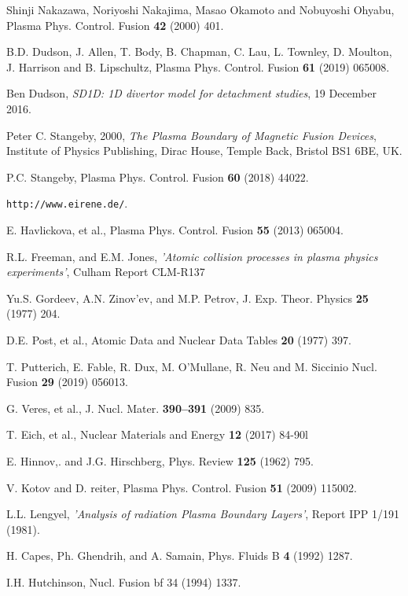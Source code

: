 \documentclass[amsmath,amssymb,a4]{revtex4-2}
\begin{document}
{\begin{thebibliography}{99}
Shinji Nakazawa, Noriyoshi Nakajima, Masao Okamoto and Nobuyoshi Ohyabu, Plasma Phys. Control. Fusion {\bf 42} (2000) 401.

B.D. Dudson, J. Allen, T. Body, B. Chapman, C. Lau, L. Townley, D. Moulton, J. Harrison and B. Lipschultz, Plasma Phys. Control. Fusion {\bf 61} (2019) 065008.

Ben Dudson, {\it SD1D: 1D divertor model for detachment studies}, 19 December 2016.

Peter C. Stangeby, 2000, {\it The Plasma Boundary of Magnetic Fusion Devices}, Institute of Physics Publishing, Dirac House, Temple Back, Bristol BS1 6BE,
UK.

P.C. Stangeby, Plasma Phys. Control. Fusion {\bf 60} (2018) 44022. 


{\tt http://www.eirene.de/}.

E. Havlickova, et al., Plasma Phys. Control. Fusion {\bf 55} (2013) 065004.

R.L. Freeman, and E.M. Jones, {\it 'Atomic collision processes in plasma physics experiments'}, Culham Report CLM-R137

Yu.S. Gordeev, A.N. Zinov'ev, and M.P. Petrov, J. Exp. Theor. Physics {\bf 25} (1977) 204.

D.E. Post, et al., Atomic Data and Nuclear Data Tables {\bf 20} (1977) 397.

T. Putterich, E. Fable, R. Dux, M. O'Mullane, R. Neu and M. Siccinio Nucl. Fusion {\bf 29} (2019) 056013.

G. Veres, et al., J. Nucl. Mater. {\bf 390–391} (2009) 835.

T. Eich, et al., Nuclear Materials and Energy {\bf 12} (2017) 84-90l

E. Hinnov,. and J.G. Hirschberg, Phys. Review {\bf 125} (1962) 795.

V. Kotov and D. reiter, Plasma Phys. Control. Fusion {\bf 51} (2009) 115002.

L.L. Lengyel, {\it 'Analysis of radiation Plasma Boundary Layers'}, Report IPP 1/191 (1981).

H. Capes, Ph. Ghendrih, and A. Samain, Phys. Fluids B {\bf 4} (1992) 1287.

I.H. Hutchinson, Nucl. Fusion {bf 34} (1994) 1337.


\end{thebibliography}}
\end{document}
